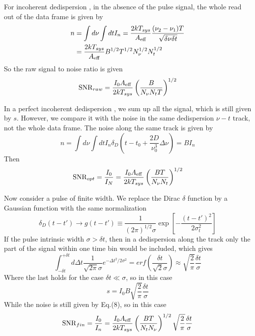 \documentclass[iop]{emulateapj}
\begin{document}
	For incoherent dedispersion , in the absence of the pulse signal, the whole read out of the data frame is given by 
	\begin{equation}
	\begin{aligned}
	n &=  \int d\nu\int dt I_n = \frac{2kT_{sys}}{A_{\rm eff}}\frac{(\nu_2 -\nu_1) T}{\sqrt{\delta \nu \delta t}} \\
	  &=  \frac{2kT_{sys}}{A_{\rm eff}} B^{1/2} T^{1/2}N_{\nu}^{1/2}N_t^{1/2}
	\end{aligned}
	\end{equation}
So the raw signal to noise ratio is given 
\begin{equation}
{\rm SNR}_{raw} = \frac{I_0 A_{\rm eff}}{2kT_{sys}}\left(\frac{B}{N_\nu N_t T}\right)^{1/2}
\end{equation}

	 In a perfect incoherent dedispersion , we sum up all the signal, which is still given by $s$. However, we compare it with the noise in the same dedispersion $\nu -t $ track, not the whole data frame. The noise along the same track is given by 
	 \begin{equation}
	 n = \int d\nu \int dt I_n \delta _D(t- t_0 + \frac{2D}{\nu_0 ^3}\Delta \nu)=BI_n
	 \end{equation}
Then 
\begin{equation}
{\rm SNR} _{opt} = \frac{I_0}{I_N}=\frac{I_0 A_{\rm eff}}{2kT_{sys}} \left( \frac{BT}{N_{\nu} N_t} \right)^{1/2}
\end{equation}

Now consider a pulse of finite width. We replace the Dirac $\delta$ function by a Gaussian function with the same normalization
\begin{equation}
\delta _D(t-t') \to g(t-t') \equiv \frac{1}{(2\pi)^{1/2} \sigma} \exp[-\frac{(t-t')^2}{2\sigma^2_t}]
\end{equation}
If the pulse intrinsic width $\sigma > \delta t$, then in a dedispersion along the track only the part of the signal within one time bin would be included, which gives
\begin{equation}
\int^{+\delta t}_{-\delta t} d \Delta t\frac{1}{\sqrt{2\pi }\sigma}e^{-\Delta t^2 /2\sigma^2}=erf(\frac{\delta t}{\sqrt{2}\sigma})\approx\sqrt{\frac{2}{\pi}}\frac{\delta t}{\sigma}
\end{equation}
Where the last holds for the case $\delta t \ll \sigma$, so in this case
\begin{equation}
s =I_0B\sqrt{\frac{2}{\pi}}\frac{\delta t}{\sigma}
\end{equation}
While the noise is still given by Eq.(8), so in this case
\begin{equation}
{\rm SNR}_{fin} = \frac{I_0}{I_n}=\frac{I_0A_{\rm eff}}{2kT_{sys}}\left( \frac{BT}{N_t N_{\nu}} \right) ^{1/2} \sqrt{\frac{2}{\pi}}\frac{\delta t}{\sigma}
\end{equation}
\\ \\
\end{document}
